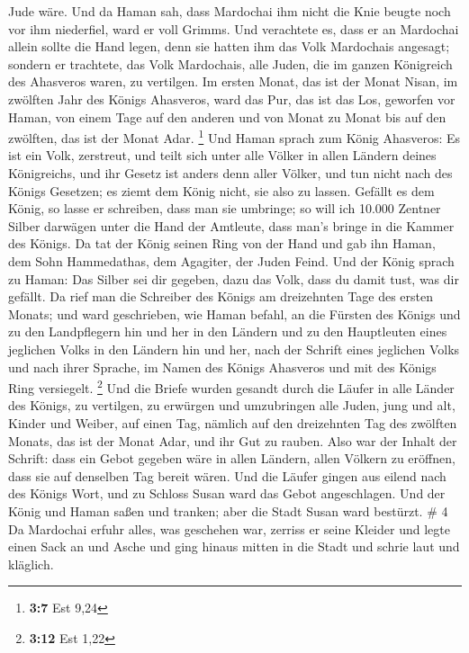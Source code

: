 Jude wäre.  Und da Haman sah, dass Mardochai ihm nicht die
Knie beugte noch vor ihm niederfiel, ward er voll Grimms. 
Und verachtete es, dass er an Mardochai allein sollte die Hand legen,
denn sie hatten ihm das Volk Mardochais angesagt; sondern er trachtete,
das Volk Mardochais, alle Juden, die im ganzen Königreich des Ahasveros
waren, zu vertilgen.  Im ersten Monat, das ist der Monat
Nisan, im zwölften Jahr des Königs Ahasveros, ward das Pur, das ist das
Los, geworfen vor Haman, von einem Tage auf den anderen und von Monat zu
Monat bis auf den zwölften, das ist der Monat Adar. \footnote{\textbf{3:7}
  Est 9,24}  Und Haman sprach zum König Ahasveros: Es ist
ein Volk, zerstreut, und teilt sich unter alle Völker in allen Ländern
deines Königreichs, und ihr Gesetz ist anders denn aller Völker, und tun
nicht nach des Königs Gesetzen; es ziemt dem König nicht, sie also zu
lassen.  Gefällt es dem König, so lasse er schreiben, dass
man sie umbringe; so will ich 10.000 Zentner Silber darwägen unter die
Hand der Amtleute, dass man's bringe in die Kammer des Königs.
 Da tat der König seinen Ring von der Hand und gab ihn
Haman, dem Sohn Hammedathas, dem Agagiter, der Juden Feind.
 Und der König sprach zu Haman: Das Silber sei dir gegeben,
dazu das Volk, dass du damit tust, was dir gefällt.  Da
rief man die Schreiber des Königs am dreizehnten Tage des ersten Monats;
und ward geschrieben, wie Haman befahl, an die Fürsten des Königs und zu
den Landpflegern hin und her in den Ländern und zu den Hauptleuten eines
jeglichen Volks in den Ländern hin und her, nach der Schrift eines
jeglichen Volks und nach ihrer Sprache, im Namen des Königs Ahasveros
und mit des Königs Ring versiegelt. \footnote{\textbf{3:12} Est 1,22}
 Und die Briefe wurden gesandt durch die Läufer in alle
Länder des Königs, zu vertilgen, zu erwürgen und umzubringen alle Juden,
jung und alt, Kinder und Weiber, auf einen Tag, nämlich auf den
dreizehnten Tag des zwölften Monats, das ist der Monat Adar, und ihr Gut
zu rauben.  Also war der Inhalt der Schrift: dass ein Gebot
gegeben wäre in allen Ländern, allen Völkern zu eröffnen, dass sie auf
denselben Tag bereit wären.  Und die Läufer gingen aus
eilend nach des Königs Wort, und zu Schloss Susan ward das Gebot
angeschlagen. Und der König und Haman saßen und tranken; aber die Stadt
Susan ward bestürzt. \# 4  Da Mardochai erfuhr alles, was
geschehen war, zerriss er seine Kleider und legte einen Sack an und
Asche und ging hinaus mitten in die Stadt und schrie laut und kläglich.
